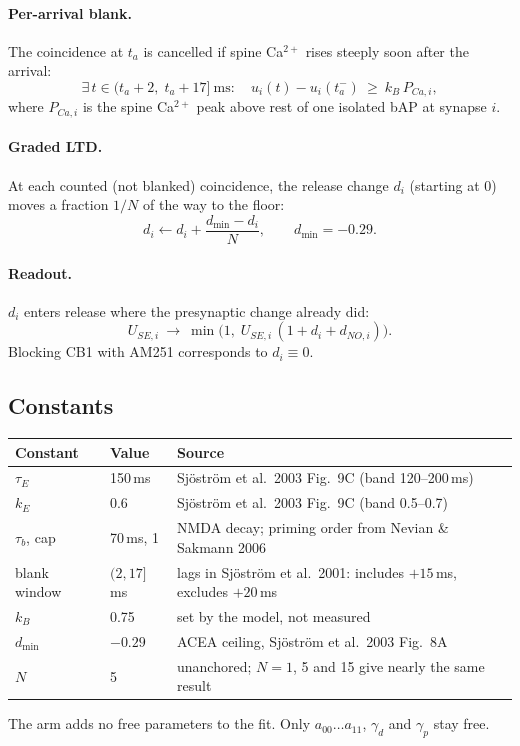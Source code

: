 \documentclass[11pt]{article}
\newcommand{\dmin}{d_{\min}}
\begin{document}
\paragraph{Per-arrival blank.} The coincidence at $t_a$ is cancelled if spine Ca$^{2+}$ rises steeply soon after the
arrival:
\begin{equation}
\exists\,t\in(t_a+2,\;t_a+17]\ \text{ms}:\quad u_i(t)-u_i(t_a^-)\ \ge\ k_B\,P_{Ca,i},
\end{equation}
where $P_{Ca,i}$ is the spine Ca$^{2+}$ peak above rest of one isolated bAP at synapse $i$.

\paragraph{Graded LTD.} At each counted (not blanked) coincidence, the release change $d_i$ (starting at 0) moves
a fraction $1/N$ of the way to the floor:
\begin{equation}
d_i\leftarrow d_i+\frac{\dmin-d_i}{N},\qquad \dmin=-0.29 .
\end{equation}

\paragraph{Readout.} $d_i$ enters release where the presynaptic change already did:
\begin{equation}
U_{SE,i}\ \to\ \min\bigl(1,\;U_{SE,i}\,(1+d_i+d_{NO,i})\bigr).
\end{equation}
Blocking CB1 with AM251 corresponds to $d_i\equiv 0$.

\subsection{Constants}
\begin{center}
\small
\begin{tabular}{l l l}
\toprule
Constant & Value & Source \\
\midrule
$\tau_E$ & 150\,ms & Sj\"ostr\"om et al.\ 2003 Fig.~9C (band 120--200\,ms) \\
$k_E$ & 0.6 & Sj\"ostr\"om et al.\ 2003 Fig.~9C (band 0.5--0.7) \\
$\tau_b$, cap & 70\,ms, 1 & NMDA decay; priming order from Nevian \& Sakmann 2006 \\
blank window & $(2,17]$\,ms & lags in Sj\"ostr\"om et al.\ 2001: includes $+15$\,ms, excludes $+20$\,ms \\
$k_B$ & 0.75 & set by the model, not measured \\
$\dmin$ & $-0.29$ & ACEA ceiling, Sj\"ostr\"om et al.\ 2003 Fig.~8A \\
$N$ & 5 & unanchored; $N=1$, 5 and 15 give nearly the same result \\
\bottomrule
\end{tabular}
\end{center}
The arm adds no free parameters to the fit. Only $a_{00}\dots a_{11}$, $\gamma_d$ and $\gamma_p$ stay free.
\end{document}
